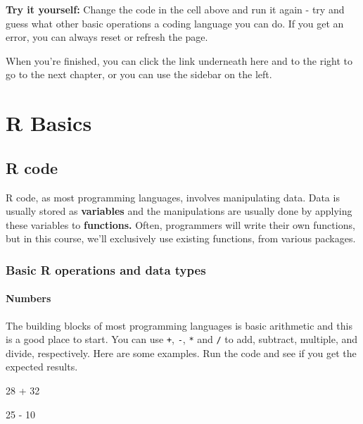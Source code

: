 \documentclass[
  letterpaper,
  DIV=11,
  numbers=noendperiod]{scrreprt}
\newenvironment{Shaded}{\begin{snugshade}}{\end{snugshade}}
\newcommand{\NormalTok}[1]{\textcolor[rgb]{0.00,0.23,0.31}{#1}}
\begin{document}
\textbf{Try it yourself:} Change the code in the cell above and run it
again - try and guess what other basic operations a coding language you
can do. If you get an error, you can always reset or refresh the page.

When you're finished, you can click the link underneath here and to the
right to go to the next chapter, or you can use the sidebar on the left.

\chapter{R Basics}\label{r-basics}

\section{R code}\label{r-code}

R code, as most programming languages, involves manipulating data. Data
is usually stored as \textbf{variables} and the manipulations are
usually done by applying these variables to \textbf{functions.} Often,
programmers will write their own functions, but in this course, we'll
exclusively use existing functions, from various packages.

\subsection{Basic R operations and data
types}\label{basic-r-operations-and-data-types}

\subsubsection{Numbers}\label{numbers}

The building blocks of most programming languages is basic arithmetic
and this is a good place to start. You can use \texttt{+}, \texttt{-},
\texttt{*} and \texttt{/} to add, subtract, multiple, and divide,
respectively. Here are some examples. Run the code and see if you get
the expected results.

\begin{Shaded}
\begin{Highlighting}[]
\NormalTok{28 + 32}
\end{Highlighting}
\end{Shaded}

\begin{Shaded}
\begin{Highlighting}[]
\NormalTok{25 {-} 10}
\end{Highlighting}
\end{Shaded}
\end{document}
